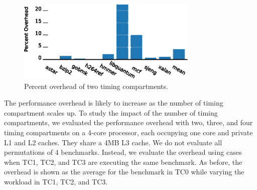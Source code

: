 \begin{figure}
   \begin{center}
       \includegraphics[width=3.4in]{figs/two_tcs.eps}
       \caption{Percent overhead of two timing compartments.}
       \label{fig:two_tc_overhead}
	   \vspace{-0.2in}
   \end{center}
\end{figure}



The performance overhead is likely to increase as the number of timing 
compartment scales up. To study the impact of the number of timing 
compartments, we evaluated the performance overhead with two, three, and four 
timing compartments on a 4-core  processor, each occupying one core and private 
L1 and L2 caches. They share a 4MB L3 cache. We do not evaluate all 
permutations of 4 benchmarks. Instead, we evaluate the overhead using cases
when TC1, TC2, and TC3 are executing the same benchmark. As 
before, the overhead is shown as the average for the benchmark in TC0 while
varying the workload in TC1, TC2, and TC3.

